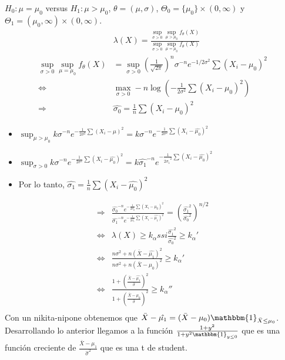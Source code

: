\documentclass[10pt]{article}
\theoremstyle{plain}
\theoremstyle{definition}
\begin{document}
$H_{0}:\mu=\mu_{0}$ versus $H_{1}: \mu > \mu_{0}$, $\theta = (\mu,\sigma)$, $\Theta_{0}=\{\mu_{0}\}\times (0,\infty)$ y $\Theta_{1}=(\mu_{0},\infty)\times (0,\infty)$.
\begin{align*}
&\lambda(X) = \frac{\sup_{\sigma>0}\sup_{\mu>\mu_{0}}f_{\theta}(X)}{\sup_{\sigma>0}\sup_{\mu=\mu_{0}}f_{\theta}(X)}\\
\sup_{\sigma>0}\sup_{\mu=\mu_{0}}f_{\theta}(X) &= \sup_{\sigma>0} \left(\frac{1}{\sqrt{2\pi}}\right)^n\sigma^{-n}e^{-1/2\sigma^2}\sum (X_{i}-\mu_{0})^2\\
\Leftrightarrow &\max_{\sigma>0} -n\log \left(-\frac{1}{2\sigma^2}\sum (X_{i}-\mu_{0})^2\right)\\
\Rightarrow & \hat{\sigma_{0}} = \frac{1}{n} \sum (X_{i}-\mu_{0})^2
\end{align*}
\begin{itemize}
\item $\sup_{\mu>\mu_{0}}k\sigma^{-n}e^{-\frac{1}{2\sigma^2}\sum (X_{i}- \mu)^2} = k \sigma^{-n}e^{-\frac{1}{2\sigma^2}\sum (X_{i}-\hat{\mu_{0}})^2}$
\item $\sup_{\sigma>0}k\sigma^{-n}e^{-\frac{1}{2\sigma^2}\sum (X_{i}- \hat{\mu_{0}})^2} = k \hat{\sigma_{1}}^{-n}e^{-\frac{1}{2\hat{\sigma_{1}}^2}\sum (X_{i}-\hat{\mu_{0}})^2}$
\item Por lo tanto, $\hat{\sigma_{1}} = \frac{1}{n}\sum (X_{i}-\hat{\mu_{0}})^2$
\end{itemize}
\begin{align*}
\Rightarrow & \frac{\hat{\sigma_{0}}^{-n}e^{-\frac{1}{2\hat{\sigma_{0}}}\sum (X_{i}-\mu_{0})^2}}{\hat{\sigma_{1}}^{-n}e^{-\frac{1}{2\hat{\sigma_{1}}}\sum (X_{i}-\hat{\mu_{1}})^2}} = \left(\frac{\hat{\sigma_{1}}^2}{\hat{\sigma_{0}}^2}\right)^{n/2}\\
\Leftrightarrow & \lambda(X) \ge k_{\alpha} ssi \frac{\hat{\sigma_{1}}^2}{\hat{\sigma_{0}}^2} \ge k_{\alpha}'\\
\Leftrightarrow &\frac{n\sigma^2 + n(\bar{X}-\hat{\mu_{1}})^2}{n\sigma^2+n(\bar{X}-\mu_{0})^2}\ge k_{\alpha}'\\
\Leftrightarrow &\frac{1 + \left(\frac{\bar{X}-\hat{\mu_{1}}}{\hat{\sigma}}\right)^2}{1 + \left(\frac{\bar{X}-\mu_{0}}{\hat{\sigma}}\right)^2}\ge k_{\alpha}''\\
\end{align*}
Con un nikita-nipone obtenemos que $\bar{X}-\hat{\mu_{1}} = (\bar{X}-\mu_{0})\mathbbm{1}_{\bar{X}\le \mu_{0}}$. Desarrollando lo anterior llegamos a la función $\frac{1+y^2}{1+y^2\mathbbm{1}_{y\le0}}$ que es una función creciente de $\frac{\bar{X}-\mu_{1}}{\hat{\sigma}^2}$ que es una t de student.
\end{document}
